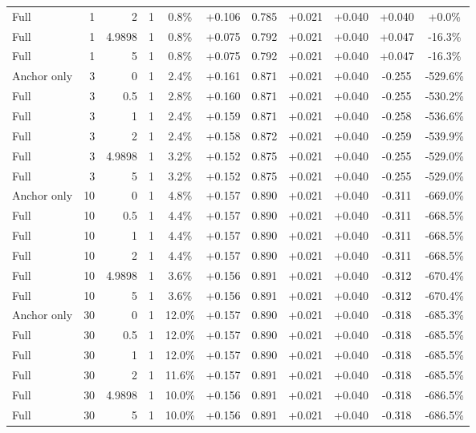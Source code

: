 \begin{table}[htbp]
\begin{tabular}{lrrrccccccc}
Full & 1 & 2 & 1 & 0.8\% & +0.106 & 0.785 & +0.021 & +0.040 & +0.040 & +0.0\% \\
Full & 1 & 4.9898 & 1 & 0.8\% & +0.075 & 0.792 & +0.021 & +0.040 & +0.047 & -16.3\% \\
Full & 1 & 5 & 1 & 0.8\% & +0.075 & 0.792 & +0.021 & +0.040 & +0.047 & -16.3\% \\
Anchor only & 3 & 0 & 1 & 2.4\% & +0.161 & 0.871 & +0.021 & +0.040 & -0.255 & -529.6\% \\
Full & 3 & 0.5 & 1 & 2.8\% & +0.160 & 0.871 & +0.021 & +0.040 & -0.255 & -530.2\% \\
Full & 3 & 1 & 1 & 2.4\% & +0.159 & 0.871 & +0.021 & +0.040 & -0.258 & -536.6\% \\
Full & 3 & 2 & 1 & 2.4\% & +0.158 & 0.872 & +0.021 & +0.040 & -0.259 & -539.9\% \\
Full & 3 & 4.9898 & 1 & 3.2\% & +0.152 & 0.875 & +0.021 & +0.040 & -0.255 & -529.0\% \\
Full & 3 & 5 & 1 & 3.2\% & +0.152 & 0.875 & +0.021 & +0.040 & -0.255 & -529.0\% \\
Anchor only & 10 & 0 & 1 & 4.8\% & +0.157 & 0.890 & +0.021 & +0.040 & -0.311 & -669.0\% \\
Full & 10 & 0.5 & 1 & 4.4\% & +0.157 & 0.890 & +0.021 & +0.040 & -0.311 & -668.5\% \\
Full & 10 & 1 & 1 & 4.4\% & +0.157 & 0.890 & +0.021 & +0.040 & -0.311 & -668.5\% \\
Full & 10 & 2 & 1 & 4.4\% & +0.157 & 0.890 & +0.021 & +0.040 & -0.311 & -668.5\% \\
Full & 10 & 4.9898 & 1 & 3.6\% & +0.156 & 0.891 & +0.021 & +0.040 & -0.312 & -670.4\% \\
Full & 10 & 5 & 1 & 3.6\% & +0.156 & 0.891 & +0.021 & +0.040 & -0.312 & -670.4\% \\
Anchor only & 30 & 0 & 1 & 12.0\% & +0.157 & 0.890 & +0.021 & +0.040 & -0.318 & -685.3\% \\
Full & 30 & 0.5 & 1 & 12.0\% & +0.157 & 0.890 & +0.021 & +0.040 & -0.318 & -685.5\% \\
Full & 30 & 1 & 1 & 12.0\% & +0.157 & 0.890 & +0.021 & +0.040 & -0.318 & -685.5\% \\
Full & 30 & 2 & 1 & 11.6\% & +0.157 & 0.891 & +0.021 & +0.040 & -0.318 & -685.5\% \\
Full & 30 & 4.9898 & 1 & 10.0\% & +0.156 & 0.891 & +0.021 & +0.040 & -0.318 & -686.5\% \\
Full & 30 & 5 & 1 & 10.0\% & +0.156 & 0.891 & +0.021 & +0.040 & -0.318 & -686.5\% \\

\end{tabular}
\end{table}
